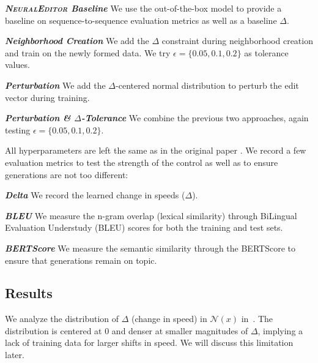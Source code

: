 \textit{\textbf{\textsc{NeuralEditor} Baseline}} We use the out-of-the-box model to provide a baseline on sequence-to-sequence evaluation metrics as well as a baseline $\Delta$.

\textit{\textbf{Neighborhood Creation}} We add the $\Delta$ constraint during neighborhood creation and train on the newly formed data. We try $\epsilon = \{0.05, 0.1, 0.2\}$ as tolerance values.

\textit{\textbf{Perturbation}} We add the $\Delta$-centered normal distribution to perturb the edit vector during training.

\textit{\textbf{Perturbation \& $\Delta$-Tolerance}} We combine the previous two approaches, again testing $\epsilon = \{0.05, 0.1, 0.2\}$.

All hyperparameters are left the same as in the original paper \citep{guu2018generating}. We record a few evaluation metrics to test the strength of the control as well as to ensure generations are not too different:

\textit{\textbf{Delta}} We record the learned change in speeds (\ie $\Delta$).

\textit{\textbf{BLEU}} We measure the n-gram overlap (lexical similarity) through BiLingual Evaluation Understudy (BLEU) scores \citep{Papineni2002bleu} for both the training and test sets. 

\textit{\textbf{BERTScore}} We measure the semantic similarity through the BERTScore \citep{zhang2019bertscore} to ensure that generations remain on topic.

\subsection{Results}
\label{subsec:ne_results}

We analyze the distribution of $\Delta$ (\ie change in speed) in $\mathcal{N}(x)$ in~. The distribution is centered at 0 and denser at smaller magnitudes of $\Delta$, implying a lack of training data for larger shifts in speed. We will discuss this limitation later.

